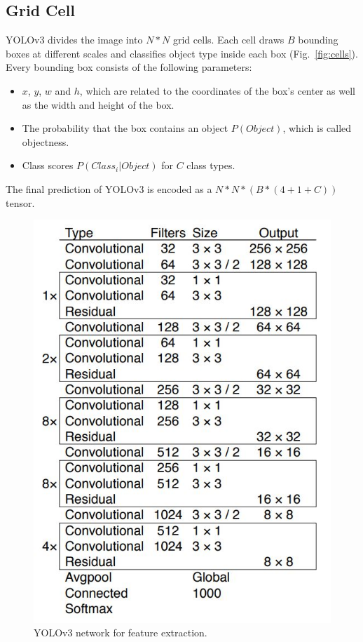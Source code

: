 \documentclass[letterpaper]{article} %
\begin{document}
\subsection{Grid Cell}
YOLOv3 divides the image into $N*N$ grid cells. Each cell draws $B$ bounding boxes at different scales and classifies object type inside each box (Fig.~\ref{fig:cells}). Every bounding box consists of the following parameters:
\begin{itemize}
    \item $x$, $y$, $w$ and $h$, which are related to the coordinates of the box's center as well as the width and height of the box.
    \item The probability that the box contains an object $P(Object)$, which is called objectness.
    \item Class scores $P(Class_{i}|Object)$ for $C$ class types.
\end{itemize}
The final prediction of YOLOv3 is encoded as a $N*N*(B*(4+1+C))$ tensor.

\begin{figure}[ht]
\hspace{-8mm}
\centering
\includegraphics[width=0.85\linewidth,height = 1\linewidth]{Figure/yolov3_structure.JPG}
\caption{\footnotesize{YOLOv3 network for feature extraction.}}
\label{fig:network}
\vspace{-2mm}
\end{figure}
\end{document}
